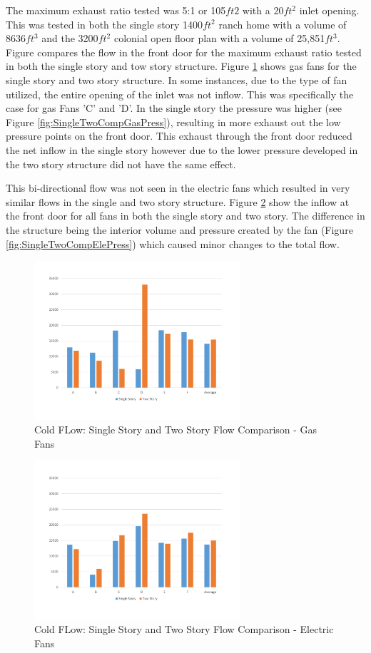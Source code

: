 \documentclass{article}
\begin{document}
The maximum exhaust ratio tested was 5:1 or 105$ft2$ with a 20$ft^2$ inlet opening. This was tested in both the single story 1400$ft^2$ ranch home with a volume of 8636$ft^3$ and the 3200$ft^2$ colonial open floor plan with a volume of 25,851$ft^3$. Figure  compares the flow in the front door for the maximum exhaust ratio tested in both the single story and tow story structure. Figure \ref{fig:SingleTwoCompGasFlow} shows gas fans for the single story and two story structure. In some instances, due to the type of fan utilized, the entire opening of the inlet was not inflow. This was specifically the case for gas Fans 'C' and 'D'. In the single story the pressure was higher (see Figure \ref{fig:SingleTwoCompGasPress}), resulting in more exhaust out the low pressure points on the front door. This exhaust through the front door reduced the net inflow in the single story however due to the lower pressure developed in the two story structure did not have the same effect. 

This bi-directional flow was not seen in the electric fans which resulted in very similar flows in the single and two story structure. Figure \ref{fig:SingleTwoCompEleFlow} show the inflow at the front door for all fans in both the single story and two story. The difference in the structure being the interior volume and pressure created by the fan (Figure \ref{fig:SingleTwoCompElePress}) which caused minor changes to the total flow. 

\begin{figure}[H]
	\centering
	\includegraphics[width=3in]{0_Images/ColdFlow/Gas_Flow.pdf}
	\caption{Cold FLow: Single Story and Two Story Flow Comparison - Gas Fans}
	\label{fig:SingleTwoCompGasFlow}
\end{figure}

\begin{figure}[H]
	\centering
	\includegraphics[width=3in]{0_Images/ColdFlow/Ele_Flow.pdf}
	\caption{Cold FLow: Single Story and Two Story Flow Comparison - Electric Fans}
	\label{fig:SingleTwoCompEleFlow}
\end{figure}
\end{document}
